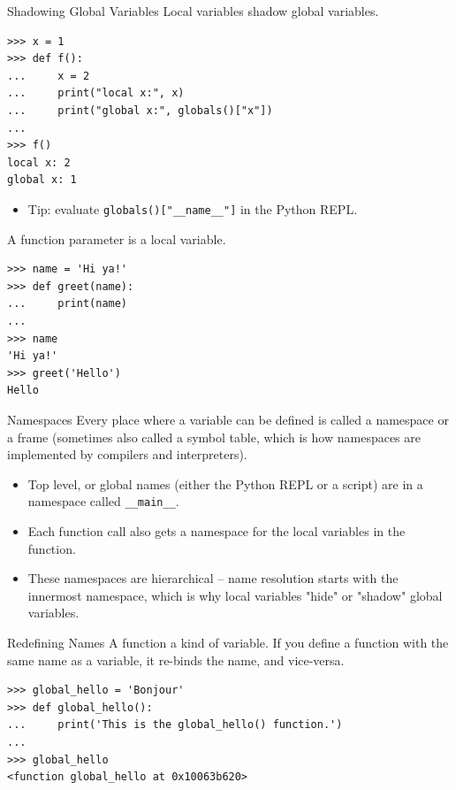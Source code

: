 \documentclass[smaller, aspectratio=1610]{beamer}
\begin{document}
\begin{frame}[label={sec:org21689c5},fragile]{Shadowing Global Variables}
 Local variables shadow global variables.

\lstset{language=Python,label= ,caption= ,captionpos=b,numbers=none}
\begin{lstlisting}
>>> x = 1
>>> def f():
...     x = 2
...     print("local x:", x)
...     print("global x:", globals()["x"])
...
>>> f()
local x: 2
global x: 1
\end{lstlisting}

\begin{itemize}
\item Tip: evaluate \texttt{globals()["\_\_name\_\_"]} in the Python REPL.
\end{itemize}

A function parameter is a local variable.

\lstset{language=Python,label= ,caption= ,captionpos=b,numbers=none}
\begin{lstlisting}
>>> name = 'Hi ya!'
>>> def greet(name):
...     print(name)
...
>>> name
'Hi ya!'
>>> greet('Hello')
Hello
\end{lstlisting}
\end{frame}

\begin{frame}[label={sec:org090aaf6},fragile]{Namespaces}
 Every place where a variable can be defined is called a \alert{namespace} or a \alert{frame} (sometimes also called a \alert{symbol table}, which is how namespaces are implemented by compilers and interpreters).

\begin{itemize}
\item Top level, or \alert{global} names (either the Python REPL or a script) are in a namespace called \texttt{\_\_main\_\_}.
\item Each function \alert{call} also gets a namespace for the local variables in the function.
\item These namespaces are hierarchical -- name resolution starts with the innermost namespace, which is why local variables "hide" or "shadow" global variables.
\end{itemize}
\end{frame}

\begin{frame}[label={sec:org961b6c8},fragile]{Redefining Names}
 A function a kind of variable. If you define a function with the same name as a variable, it re-binds the name, and vice-versa.

\lstset{language=Python,label= ,caption= ,captionpos=b,numbers=none}
\begin{lstlisting}
>>> global_hello = 'Bonjour'
>>> def global_hello():
...     print('This is the global_hello() function.')
...
>>> global_hello
<function global_hello at 0x10063b620>
\end{lstlisting}
\end{frame}
\end{document}
